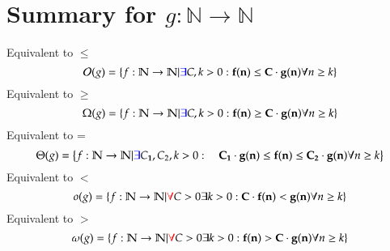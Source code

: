 \documentclass{article}[18pt]
\begin{document}
\section{Summary for $g:\mathbb{ N }\rightarrow \mathbb{ N }$}
Equivalent to $\leqslant$
$$\mathcal { O } ( g ) = \{ f : \mathbb{ N } \rightarrow \mathbb{ N } | \textcolor{blue}{\exists} C , k > 0 : \mathbf{f ( n ) \leq C \cdot g ( n )} \forall n \geq k \}$$
Equivalent to $\geqslant$
$$\Omega ( g ) = \{ f :  \mathbb{ N } \rightarrow \mathbb{ N } | \textcolor{blue}{\exists} C , k > 0 :\mathbf{ f ( n ) \geq C \cdot g ( n )} \forall n \geq k \}$$
Equivalent to =
$$\Theta ( g ) = \left\{ f : \mathbb{ N } \rightarrow \mathbb{ N } | \textcolor{blue}{\exists} C _ { \mathbf { 1 } } , C _ { 2 } , k > 0 : \mathbf{\quad C _ { \mathbf { 1 } } \cdot g ( n ) \leq f ( n ) \leq C _ { 2 } \cdot g ( n )} \forall n \geq k \right\}$$
Equivalent to $<$
$$o ( g ) = \{ f : \mathbb{ N } \rightarrow \mathbb{ N } | \textcolor{red}{\forall} C > 0 \exists k > 0 : \mathbf{C \cdot f ( n ) < g ( n )} \forall n \geq k \}$$
Equivalent to $>$
$$\omega ( g ) = \{ f : \mathbb{ N } \rightarrow \mathbb{ N } | \textcolor{red}{\forall} C > 0 \exists k > 0 : \mathbf{f ( n ) > C \cdot g ( n )} \forall n \geq k \}$$
\end{document}
